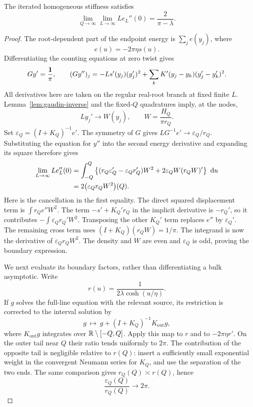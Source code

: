 \begin{lemma}\label{lem:stiffness}
The iterated homogeneous stiffness satisfies
\begin{equation}\label{eq:stiffness-value}
 \lim_{Q\to\infty}\lim_{L\to\infty}L e_L''(0)
      =\frac2{\pi-\lambda}.
\end{equation}
\end{lemma}
\begin{proof}
The root-dependent part of the endpoint energy is
\(\sum_j e(y_j)\), where
\[
 e(u)=-2\pi\eta s(u).
\]
Differentiating the counting equations at zero twist gives
\[
 G y'=\frac{\mathbf1}{\pi},\qquad
 (G y'')_j=-L s'(y_j)(y'_j)^2
      +\sum_kK'(y_j-y_k)(y'_j-y'_k)^2.
\]
All derivatives here are taken on the regular real-root branch at fixed
finite \(L\). Lemma~\ref{lem:gaudin-inverse} and the fixed-\(Q\) quadratures
imply, at the nodes,
\[
 L y_j'\longrightarrow W(y_j),\qquad
 W=\frac{H_Q}{\pi r_Q}.
\]
Set \(\varepsilon_Q=(I+K_Q)^{-1}e'\).
The symmetry of \(G\) gives
\(L G^{-1}e'\to\varepsilon_Q/r_Q\).
Substituting the equation for \(y''\) into the second energy derivative
and expanding its square therefore gives
\begin{align}
 \lim_{L\to\infty}L e_L''(0)
 &=\int_{-Q}^{Q}
   \left\{(r_Q\varepsilon_Q'-\varepsilon_Qr_Q')W^2
       +2\varepsilon_Q W(r_QW)'\right\}\,\,\mathrm d u \notag\\
 &=2\bigl(\varepsilon_Qr_QW^2\bigr)(Q).
 \label{eq:stiffness-boundary}
\end{align}
Here is the cancellation in the first equality. The direct squared
displacement term is \(\int r_Q e''W^2\).
The term \(-s'+K_Q'r_Q\) in the implicit derivative is
\(-r_Q'\), so it contributes \(-\int\varepsilon_Qr_Q'W^2\).
Transposing the other \(K_Q'\) term replaces \(e''\) by
\(\varepsilon_Q'\). The remaining cross term uses
\((I+K_Q)(r_QW)=1/\pi\).
The integrand is now the derivative of
\(\varepsilon_Qr_QW^2\). The density and \(W\) are even and
\(\varepsilon_Q\) is odd, proving the boundary expression.

We next evaluate its boundary factors, rather than differentiating a
bulk asymptotic. Write
\[
 r(u)=\frac1{2\lambda\cosh(u/\eta)}.
\]
If \(g\) solves the full-line equation with the relevant source, its
restriction is corrected to the interval solution by
\[
 g\ \longmapsto\
 g+(I+K_Q)^{-1}K_{\mathrm{out}}g,
\]
where \(K_{\mathrm{out}}g\) integrates over \(\mathbb R\setminus[-Q,Q]\).
Apply this map to \(r\) and to \(-2\pi\eta r'\).
On the outer tail near \(Q\) their ratio tends uniformly to \(2\pi\).
The contribution of the opposite tail is negligible relative to \(r(Q)\):
insert a sufficiently small exponential weight in the convergent Neumann
series for \(K_Q\), and use the separation of the two ends.
The same comparison gives \(r_Q(Q)\asymp r(Q)\), hence
\[
 \frac{\varepsilon_Q(Q)}{r_Q(Q)}\longrightarrow2\pi.
\]


\end{proof}
